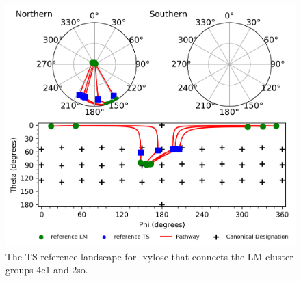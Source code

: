 \documentclass{article}
\begin{document}
\begin{figure}[h!]
	\centering
	\includegraphics[width=\textwidth,height=\textheight,keepaspectratio]
	{figures/bxyl/z_dataset-bxyl-TS-reference-0_4.png}
	\caption{The TS reference landscape for \textbeta-xylose that connects the LM cluster groups 4c1 and 2so.}
	\label{fig:spherical_kmeans_TS_individual}
\end{figure}
\end{document}
